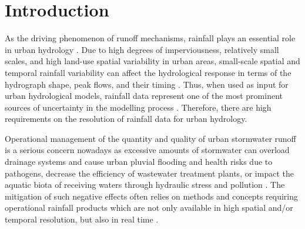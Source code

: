 \documentclass{ctuthesis}\usepackage[]{graphicx}\usepackage[]{color}
\begin{document}
        \maketitle
        


\chapter{Introduction} \label{chap1}

As the driving phenomenon of runoff mechanisms, rainfall plays an essential role in urban hydrology \citep{berneTemporalSpatialResolution2004}. Due to high degrees of imperviousness, relatively small scales, and high land-use spatial variability in urban areas, small-scale spatial and temporal rainfall variability can affect the hydrological response in terms of the hydrograph shape, peak flows, and their timing \citep{cristianoSpatialTemporalVariability2017, ochoa-rodriguezImpactSpatialTemporal2015, rico-ramirezQuantifyingRadarrainfallUncertainties2015}. Thus, when used as input for urban hydrological models, rainfall data represent one of the most prominent sources of uncertainty in the modelling process \citep{schellartInfluenceRainfallEstimation2012, thorndahlEventBasedUncertainty2008}. Therefore, there are high requirements on the resolution of rainfall data for urban hydrology. 

Operational management of the quantity and quality of urban stormwater runoff is a serious concern nowadays as excessive amounts of stormwater can overload drainage systems and cause urban pluvial flooding and health risks due to pathogens, decrease the efficiency of wastewater treatment plants, or impact the aquatic biota of receiving waters through hydraulic stress and pollution \citep{tsihrintzisModelingManagementUrban1997}. The mitigation of such negative effects often relies on methods and concepts requiring operational rainfall products which are not only available in high spatial and/or temporal resolution, but also in real time \citep{einfaltRoadmapUseRadar2004}.
\end{document}
